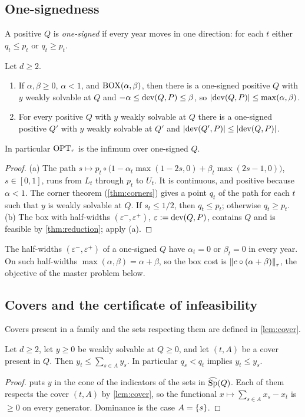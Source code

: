 \subsection{One-signedness}
A positive $Q$ is \emph{one-signed} if every year moves in one direction: for each $t$ either $q_t\le p_t$ or $q_t\ge p_t$.
\begin{theorem}\label{thm:onesigned}
Let $d\ge2$.
\begin{enumerate}[label=(\alph*)]
\item If $\alpha,\beta\ge0$, $\alpha<1$, and $\mathrm{BOX}(\alpha,\beta)$, then there is a one-signed positive $Q$ with $y$ weakly solvable at $Q$ and $-\alpha\le\operatorname{dev}(Q,P)\le\beta$, so $\left\lvert \operatorname{dev}(Q,P) \right\rvert\le\max(\alpha,\beta)$.
\item For every positive $Q$ with $y$ weakly solvable at $Q$ there is a one-signed positive $Q'$ with $y$ weakly solvable at $Q'$ and $\left\lvert \operatorname{dev}(Q',P) \right\rvert\le\left\lvert \operatorname{dev}(Q,P) \right\rvert$.
\end{enumerate}
In particular $\mathrm{OPT}_r$ is the infimum over one-signed $Q$.
\end{theorem}
\begin{proof}
(a) The path $s\mapsto p_t\circ\bigl(1-\alpha_t\max(1-2s,0)+\beta_t\max(2s-1,0)\bigr)$, $s\in[0,1]$, runs from $L_t$ through $p_t$ to $U_t$. It is continuous, and positive because $\alpha<1$. The corner theorem (\cref{thm:corners}) gives a point $q_t$ of the path for each $t$ such that $y$ is weakly solvable at $Q$. If $s_t\le1/2$, then $q_t\le p_t$; otherwise $q_t\ge p_t$. (b) The box with half-widths $(\varepsilon^-,\varepsilon^+)$, $\varepsilon:=\operatorname{dev}(Q,P)$, contains $Q$ and is feasible by \cref{thm:reduction}; apply (a).
\end{proof}
The half-widths $(\varepsilon^-,\varepsilon^+)$ of a one-signed $Q$ have $\alpha_t=0$ or $\beta_t=0$ in every year. On such half-widths $\max(\alpha,\beta)=\alpha+\beta$, so the box cost is $\left\lVert c\circ(\alpha+\beta) \right\rVert_r$, the objective of the master problem below.

\subsection{Covers and the certificate of infeasibility}\label{sec:covers}
Covers present in a family and the sets respecting them are defined in \cref{lem:cover}.
\begin{proposition}[cover]\label{prop:cover}
Let $d\ge2$, let $y\ge0$ be weakly solvable at $Q\ge0$, and let $(t,A)$ be a cover present in $Q$. Then $y_t\le\sum_{s\in A}y_s$. In particular $q_s<q_t$ implies $y_t\le y_s$.
\end{proposition}
\begin{proof}
 puts $y$ in the cone of the indicators of the sets in $\widehat{\operatorname{Sp}}(Q)$. Each of them respects the cover $(t,A)$ by \cref{lem:cover}, so the functional $x\mapsto\sum_{s\in A}x_s-x_t$ is $\ge0$ on every generator. Dominance is the case $A=\left\{ s \right\}$.
\end{proof}

